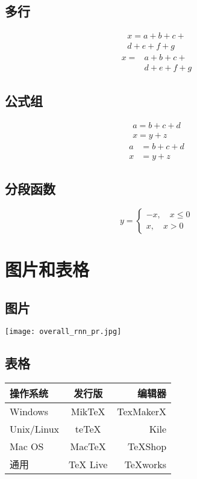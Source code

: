 \documentclass[UTF8]{ctexart}
\begin{document}
\subsection{多行}
\begin{multline}
x = a+b+c+{} \\
d+e+f+g
\end{multline}
\[\begin{aligned}
x ={}& a+b+c+{} \\
&d+e+f+g
\end{aligned}\]

\subsection{公式组}
\begin{gather}
a = b+c+d \\
x = y+z
\end{gather}
\begin{align}
a &= b+c+d \\
x &= y+z
\end{align}
\subsection{分段函数}
\[ y= \begin{cases}
-x,\quad x\leq 0 \\
x,\quad x>0
\end{cases} \]

\section{图片和表格}
\subsection{图片}
\texttt{[image: overall\_rnn\_pr.jpg]}

\subsection{表格}
\begin{tabular}{|l|c|r|}
 \hline
操作系统& 发行版& 编辑器\\
 \hline
Windows & MikTeX & TexMakerX \\
 \hline
Unix/Linux & teTeX & Kile \\
 \hline
Mac OS & MacTeX & TeXShop \\
 \hline
通用& TeX Live & TeXworks \\
 \hline
\end{tabular}
\end{document}

